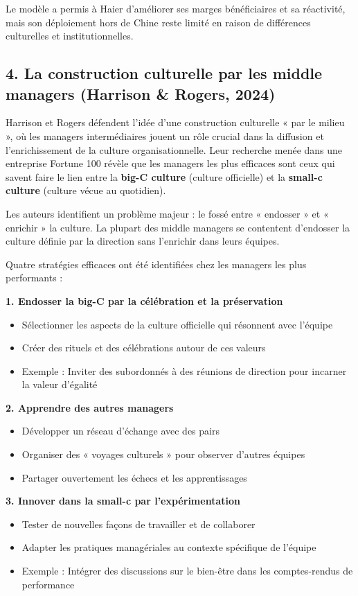 \documentclass{rapportECL}
\begin{document}
Le modèle a permis à Haier d'améliorer ses marges bénéficiaires et sa réactivité, mais son déploiement hors de Chine reste limité en raison de différences culturelles et institutionnelles.

\subsection*{4. La construction culturelle par les middle managers (Harrison \& Rogers, 2024)}

Harrison et Rogers défendent l'idée d'une construction culturelle « par le milieu », où les managers intermédiaires jouent un rôle crucial dans la diffusion et l'enrichissement de la culture organisationnelle. Leur recherche menée dans une entreprise Fortune 100 révèle que les managers les plus efficaces sont ceux qui savent faire le lien entre la \textbf{big-C culture} (culture officielle) et la \textbf{small-c culture} (culture vécue au quotidien).

Les auteurs identifient un problème majeur : le fossé entre « endosser » et « enrichir » la culture. La plupart des middle managers se contentent d'endosser la culture définie par la direction sans l'enrichir dans leurs équipes.

\newpage

Quatre stratégies efficaces ont été identifiées chez les managers les plus performants :

\textbf{1. Endosser la big-C par la célébration et la préservation}
\begin{itemize}
\item Sélectionner les aspects de la culture officielle qui résonnent avec l'équipe
\item Créer des rituels et des célébrations autour de ces valeurs
\item Exemple : Inviter des subordonnés à des réunions de direction pour incarner la valeur d'égalité
\end{itemize}

\textbf{2. Apprendre des autres managers}
\begin{itemize}
\item Développer un réseau d'échange avec des pairs
\item Organiser des « voyages culturels » pour observer d'autres équipes
\item Partager ouvertement les échecs et les apprentissages
\end{itemize}

\textbf{3. Innover dans la small-c par l'expérimentation}
\begin{itemize}
\item Tester de nouvelles façons de travailler et de collaborer
\item Adapter les pratiques managériales au contexte spécifique de l'équipe
\item Exemple : Intégrer des discussions sur le bien-être dans les comptes-rendus de performance
\end{itemize}
\end{document}

